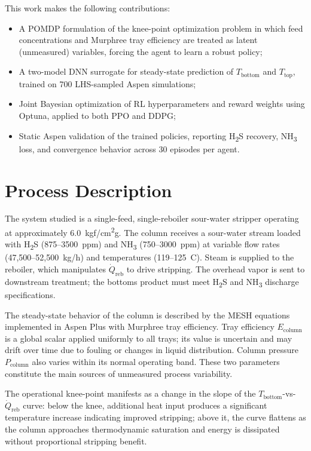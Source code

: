 \documentclass[journal,10pt,twocolumn]{IEEEtran}
\begin{document}
This work makes the following contributions:
\begin{itemize}
  \item A POMDP formulation of the knee-point optimization problem in which feed concentrations and Murphree tray efficiency are treated as latent (unmeasured) variables, forcing the agent to learn a robust policy;
  \item A two-model DNN surrogate for steady-state prediction of $T_\text{bottom}$ and $T_\text{top}$, trained on 700 LHS-sampled Aspen simulations;
  \item Joint Bayesian optimization of RL hyperparameters and reward weights using Optuna, applied to both PPO and DDPG;
  \item Static Aspen validation of the trained policies, reporting H\textsubscript{2}S recovery, NH\textsubscript{3} loss, and convergence behavior across 30 episodes per agent.
\end{itemize}

\section{Process Description}
\label{sec:process}

The system studied is a single-feed, single-reboiler sour-water stripper operating at approximately 6.0~kgf/cm\textsuperscript{2}g. The column receives a sour-water stream loaded with H\textsubscript{2}S (875--3500~ppm) and NH\textsubscript{3} (750--3000~ppm) at variable flow rates (47,500--52,500~kg/h) and temperatures (119--125~\textdegree C). Steam is supplied to the reboiler, which manipulates $\dot{Q}_\text{reb}$ to drive stripping. The overhead vapor is sent to downstream treatment; the bottoms product must meet H\textsubscript{2}S and NH\textsubscript{3} discharge specifications.

The steady-state behavior of the column is described by the MESH equations implemented in Aspen Plus with Murphree tray efficiency. Tray efficiency $E_\text{column}$ is a global scalar applied uniformly to all trays; its value is uncertain and may drift over time due to fouling or changes in liquid distribution. Column pressure $P_\text{column}$ also varies within its normal operating band. These two parameters constitute the main sources of unmeasured process variability.

The operational knee-point manifests as a change in the slope of the $T_\text{bottom}$-vs-$\dot{Q}_\text{reb}$ curve: below the knee, additional heat input produces a significant temperature increase indicating improved stripping; above it, the curve flattens as the column approaches thermodynamic saturation and energy is dissipated without proportional stripping benefit.
\end{document}
